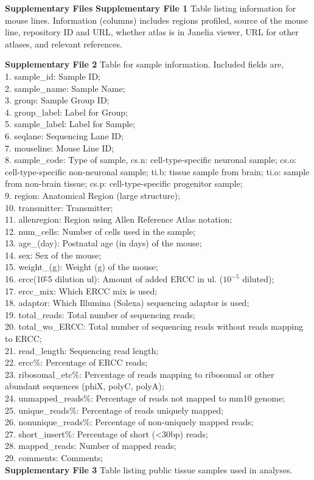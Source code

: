 \textbf{Supplementary Files} 
\textbf{Supplementary File 1} Table listing information for mouse lines. Information (columns) includes regions profiled, source of the mouse line, repository ID and URL, whether atlas is in Janelia viewer, URL for other atlases, and relevant references.

\textbf{Supplementary File 2} Table for sample information. Included fields are, \\
1. sample\_id: Sample ID; \\
2. sample\_name: Sample Name; \\ 
3. group: Sample Group ID; \\
4. group\_label: Label for Group; \\
5. sample\_label: Label for Sample;  \\
6. seqlane: Sequencing Lane ID; \\
7. mouseline: Mouse Line ID; \\
8. sample\_code: Type of sample, cs.n: cell-type-specific neuronal sample; cs.o: cell-type-specific non-neuronal sample; ti.b: tissue sample from brain; ti.o: sample from non-brain tissue; cs.p: cell-type-specific progenitor sample; \\
9. region: Anatomical Region (large structure); \\
10. transmitter: Transmitter; \\
11. allenregion: Region using Allen Reference Atlas notation; \\
12. num\_cells: Number of cells used in the sample; \\
13. age\_(day): Postnatal age (in days) of the mouse; \\
14. sex: Sex of the mouse; \\
15. weight\_(g): Weight (g) of the mouse; \\
16. ercc(10\^-5 dilution ul): Amount of added ERCC in ul. ($10^{-5}$ diluted); \\
17. ercc\_mix: Which ERCC mix is used; \\
18. adaptor: Which Illumina (Solexa) sequencing adaptor is used; \\
19. total\_reads: Total number of sequencing reads; \\
20. total\_wo\_ERCC: Total number of sequencing reads without reads mapping to ERCC; \\
21. read\_length: Sequencing read length; \\
22. ercc\%: Percentage of ERCC reads; \\
23. ribosomal\_etc\%: Percentage of reads mapping to ribosomal or other abundant sequences (phiX, polyC, polyA); \\
24. unmapped\_reads\%: Percentage of reads not mapped to mm10 genome; \\
25. unique\_reads\%: Percentage of reads uniquely mapped; \\
26. nonunique\_reads\%: Percentage of non-uniquely mapped reads; \\
27. short\_insert\%: Percentage of short (<30bp) reads; \\
28. mapped\_reads: Number of mapped reads; \\
29. comments: Comments; \\

\textbf{Supplementary File 3} Table listing public tissue samples used in analyses. 